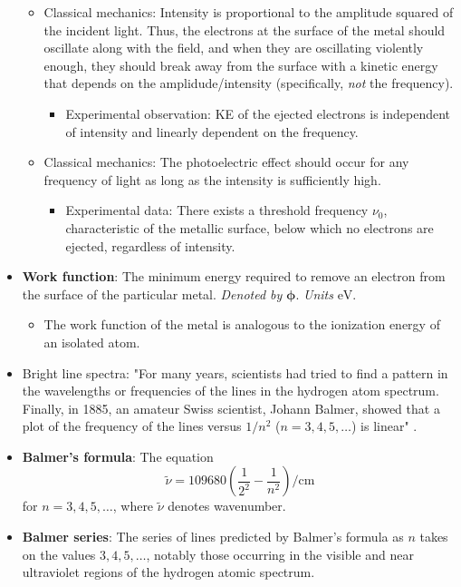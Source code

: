 \documentclass[../notes.tex]{subfiles}
\begin{document}
\begin{itemize}
\begin{itemize}
        \item Classical mechanics: Intensity is proportional to the amplitude squared of the incident light. Thus, the electrons at the surface of the metal should oscillate along with the field, and when they are oscillating violently enough, they should break away from the surface with a kinetic energy that depends on the amplidude/intensity (specifically, \emph{not} the frequency).
        \begin{itemize}
            \item Experimental observation: KE of the ejected electrons is independent of intensity and linearly dependent on the frequency.
        \end{itemize}
        \item Classical mechanics: The photoelectric effect should occur for any frequency of light as long as the intensity is sufficiently high.
        \begin{itemize}
            \item Experimental data: There exists a threshold frequency $\nu_0$, characteristic of the metallic surface, below which no electrons are ejected, regardless of intensity.
        \end{itemize}
    \end{itemize}
    \item \textbf{Work function}: The minimum energy required to remove an electron from the surface of the particular metal. \emph{Denoted by} $\bm{\phi}$. \emph{Units} $\si{\electronvolt}$.
    \begin{itemize}
        \item The work function of the metal is analogous to the ionization energy of an isolated atom.
    \end{itemize}
    \item Bright line spectra: "For many years, scientists had tried to find a pattern in the wavelengths or frequencies of the lines in the hydrogen atom spectrum. Finally, in 1885, an amateur Swiss scientist, Johann Balmer, showed that a plot of the frequency of the lines versus $1/n^2$ ($n=3,4,5,\dots$) is linear" \parencite[10]{bib:McQuarrieSimon}.
    \item \textbf{Balmer's formula}: The equation
    \begin{equation*}
        \tilde{\nu} = \num{109680}\left( \frac{1}{2^2}-\frac{1}{n^2} \right)\si{\per\centi\meter}
    \end{equation*}
    for $n=3,4,5,\dots$, where $\tilde{\nu}$ denotes wavenumber.
    \item \textbf{Balmer series}: The series of lines predicted by Balmer's formula as $n$ takes on the values $3,4,5,\dots$, notably those occurring in the visible and near ultraviolet regions of the hydrogen atomic spectrum.

\end{itemize}
\end{document}
